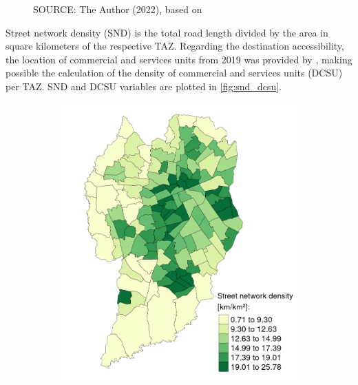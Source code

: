 \begin{figure}[!htbp]
\begin{subfigure}{0.5\textwidth}
    \end{subfigure}
    \label{fig:tsd_par}
    \par SOURCE: The Author (2022), based on \textcite{IPPUC2018b,IPPUC2021}
\end{figure}

Street network density (SND) is the total road length divided by the area in square kilometers of the respective TAZ. Regarding the destination accessibility, the location of commercial and services units from 2019 was provided by \textcite{IPPUC2021}, making possible the calculation of the density of commercial and services units (DCSU) per TAZ. SND and DCSU variables are plotted in \autoref{fig:snd_dcsu}.

\begin{figure}[!htbp]
    \centering\footnotesize
    \captionsetup{font=footnotesize}
    \caption{SND AND DCSU}
    \begin{subfigure}{0.5\textwidth}
        \includegraphics{fig/map_SND.png}
    \end{subfigure}%
    \begin{subfigure}{0.5\textwidth}

\end{subfigure}
\end{figure}
